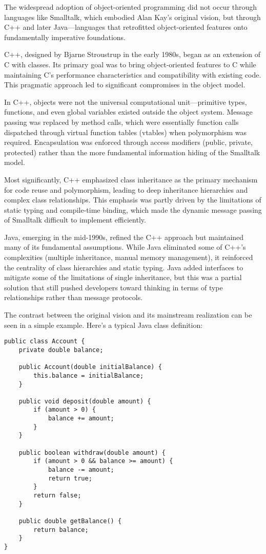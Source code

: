 \documentclass[11pt]{article}
\begin{document}
The widespread adoption of object-oriented programming did not occur through languages like Smalltalk, which embodied Alan Kay's original vision, but through C++ and later Java—languages that retrofitted object-oriented features onto fundamentally imperative foundations.

C++, designed by Bjarne Stroustrup in the early 1980s, began as an extension of C with classes. Its primary goal was to bring object-oriented features to C while maintaining C's performance characteristics and compatibility with existing code. This pragmatic approach led to significant compromises in the object model.

In C++, objects were not the universal computational unit—primitive types, functions, and even global variables existed outside the object system. Message passing was replaced by method calls, which were essentially function calls dispatched through virtual function tables (vtables) when polymorphism was required. Encapsulation was enforced through access modifiers (public, private, protected) rather than the more fundamental information hiding of the Smalltalk model.

Most significantly, C++ emphasized class inheritance as the primary mechanism for code reuse and polymorphism, leading to deep inheritance hierarchies and complex class relationships. This emphasis was partly driven by the limitations of static typing and compile-time binding, which made the dynamic message passing of Smalltalk difficult to implement efficiently.

Java, emerging in the mid-1990s, refined the C++ approach but maintained many of its fundamental assumptions. While Java eliminated some of C++'s complexities (multiple inheritance, manual memory management), it reinforced the centrality of class hierarchies and static typing. Java added interfaces to mitigate some of the limitations of single inheritance, but this was a partial solution that still pushed developers toward thinking in terms of type relationships rather than message protocols.

The contrast between the original vision and its mainstream realization can be seen in a simple example. Here's a typical Java class definition:

\begin{verbatim}
public class Account {
    private double balance;

    public Account(double initialBalance) {
        this.balance = initialBalance;
    }

    public void deposit(double amount) {
        if (amount > 0) {
            balance += amount;
        }
    }

    public boolean withdraw(double amount) {
        if (amount > 0 && balance >= amount) {
            balance -= amount;
            return true;
        }
        return false;
    }

    public double getBalance() {
        return balance;
    }
}
\end{verbatim}
\end{document}
